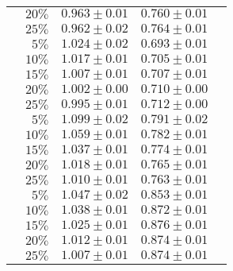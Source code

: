 \begin{table}[bt]
\begin{tabular}{lrccc}
                            & $20\%$ &  $0.963 \pm 0.01$  &  $0.760 \pm 0.01$  \\
                            & $25\%$ &  $0.962 \pm 0.02$  &  $0.764 \pm 0.01$  \\
    \midrule
    \multirow{5}{*}{\sla{}} & $5\%$  &  $1.024 \pm 0.02$  &  $0.693 \pm 0.01$  \\
                            & $10\%$ &  $1.017 \pm 0.01$  &  $0.705 \pm 0.01$  \\
                            & $15\%$ &  $1.007 \pm 0.01$  &  $0.707 \pm 0.01$  \\
                            & $20\%$ &  $1.002 \pm 0.00$  &  $0.710 \pm 0.00$  \\
                            & $25\%$ &  $0.995 \pm 0.01$  &  $0.712 \pm 0.00$  \\
    \midrule
    \multirow{5}{*}{\epi{}} & $5\%$  &  $1.099 \pm 0.02$  &  $0.791 \pm 0.02$  \\
                            & $10\%$ &  $1.059 \pm 0.01$  &  $0.782 \pm 0.01$  \\
                            & $15\%$ &  $1.037 \pm 0.01$  &  $0.774 \pm 0.01$  \\
                            & $20\%$ &  $1.018 \pm 0.01$  &  $0.765 \pm 0.01$  \\
                            & $25\%$ &  $1.010 \pm 0.01$  &  $0.763 \pm 0.01$  \\
    \midrule
    \multirow{5}{*}{\kiw{}} & $5\%$  &  $1.047 \pm 0.02$  &  $0.853 \pm 0.01$  \\
                            & $10\%$ &  $1.038 \pm 0.01$  &  $0.872 \pm 0.01$  \\
                            & $15\%$ &  $1.025 \pm 0.01$  &  $0.876 \pm 0.01$  \\
                            & $20\%$ &  $1.012 \pm 0.01$  &  $0.874 \pm 0.01$  \\
                            & $25\%$ &  $1.007 \pm 0.01$  &  $0.874 \pm 0.01$  \\
    \bottomrule
  \end{tabular}
\end{table}
